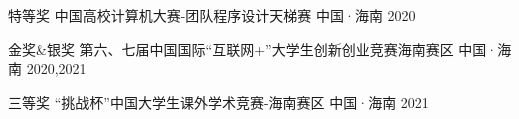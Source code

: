 

\begin{cvhonors}
    
    \cvhonor
    {特等奖} %
    {中国高校计算机大赛-团队程序设计天梯赛} %
    {中国·海南} %
    {2020} %
    
        
    \cvhonor
    {金奖\&银奖} %
    {第六、七届中国国际“互联网+”大学生创新创业竞赛海南赛区} %
    {中国·海南} %
    {2020,2021} %
    
    
    
    \cvhonor
    {三等奖} %
    {“挑战杯”中国大学生课外学术竞赛-海南赛区} %
    {中国·海南} %
    {2021} %
    
\end{cvhonors}
